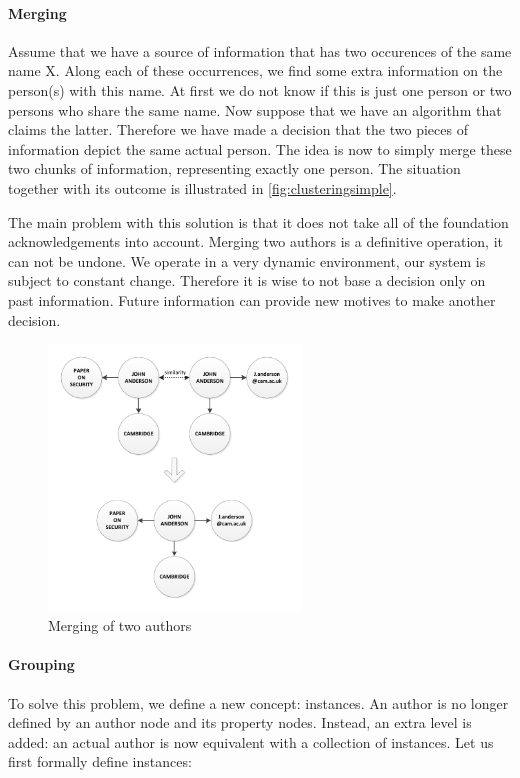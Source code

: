 \paragraph{Merging} Assume that we have a source of information that has two occurences of the same name X. Along each of these occurrences, we find some extra information on the person(s) with this name. At first we do not know if this is just one person or two persons who share the same name. Now suppose that we have an algorithm that claims the latter. Therefore we have made a decision that the two pieces of information depict the same actual person. The idea is now to simply merge these two chunks of information, representing exactly one person. The situation together with its outcome is illustrated in \autoref{fig:clusteringsimple}.

The main problem with this solution is that it does not take all of the foundation acknowledgements into account. Merging two authors is a definitive operation, it can not be undone. We operate in a very dynamic environment, our system is subject to constant change. Therefore it is wise to not base a decision only on past information. Future information can provide new motives to make another decision.

\begin{figure}[htb]
	\centering
		\includegraphics[width=0.6\textwidth]{fig/clusteringsimple}
	\caption{Merging of two authors}
	\label{fig:clusteringsimple}
\end{figure}

\paragraph{Grouping} To solve this problem, we define a new concept: instances. An author is no longer defined by an author node and its property nodes. Instead, an extra level is added: an actual author is now equivalent with a collection of instances. Let us first formally define instances:

